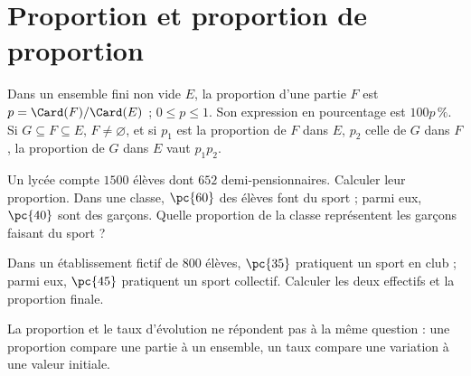 \section{Proportion et proportion de proportion}
\begin{keypoint}[Définitions]
Dans un ensemble fini non vide $E$, la proportion d'une partie $F$ est $p=\Card(F)/\Card(E)$ ; $0\leq p\leq1$. Son expression en pourcentage est $100p\,\%$.
Si $G\subseteq F\subseteq E$, $F\ne\varnothing$, et si $p_1$ est la proportion de $F$ dans $E$, $p_2$ celle de $G$ dans $F$, la proportion de $G$ dans $E$ vaut $p_1p_2$.
\end{keypoint}
\begin{example}Un lycée compte $1500$ élèves dont $652$ demi-pensionnaires. Calculer leur proportion. Dans une classe, $\pc{60}$ des élèves font du sport ; parmi eux, $\pc{40}$ sont des garçons. Quelle proportion de la classe représentent les garçons faisant du sport ?\end{example}
\begin{example}Dans un établissement fictif de $800$ élèves, $\pc{35}$ pratiquent un sport en club ; parmi eux, $\pc{45}$ pratiquent un sport collectif. Calculer les deux effectifs et la proportion finale.\end{example}
\begin{pitfall}La proportion et le taux d'évolution ne répondent pas à la même question : une proportion compare une partie à un ensemble, un taux compare une variation à une valeur initiale.\end{pitfall}

